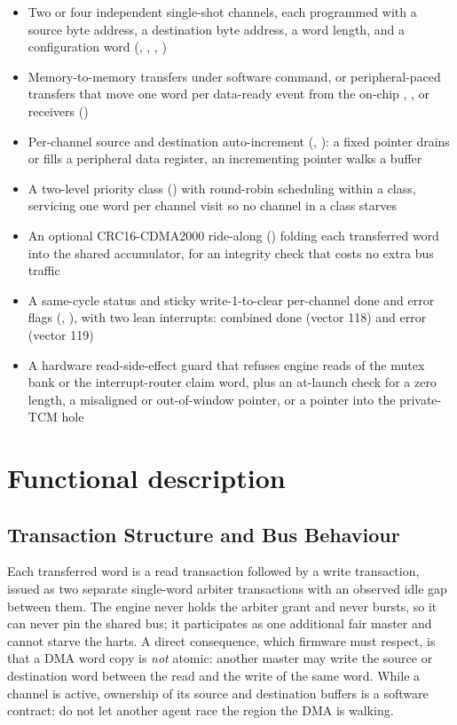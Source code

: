 \begin{itemize}
	\item Two or four independent single-shot channels, each programmed with a source byte address, a destination byte address, a word length, and a configuration word (, , , )
	\item Memory-to-memory transfers under software command, or peripheral-paced transfers that move one word per data-ready event from the on-chip , , or  receivers ()
	\item Per-channel source and destination auto-increment (, ): a fixed pointer drains or fills a peripheral data register, an incrementing pointer walks a buffer
	\item A two-level priority class () with round-robin scheduling within a class, servicing one word per channel visit so no channel in a class starves
	\item An optional \mbox{CRC16-CDMA2000} ride-along () folding each transferred word into the shared  accumulator, for an integrity check that costs no extra bus traffic
	\item A same-cycle  status and sticky write-1-to-clear per-channel done and error flags (, ), with two lean interrupts: combined done (vector 118) and error (vector 119)
	\item A hardware read-side-effect guard that refuses engine reads of the mutex bank or the interrupt-router claim word, plus an at-launch check for a zero length, a misaligned or out-of-window pointer, or a pointer into the private-TCM hole
\end{itemize}

\section{Functional description}

\subsection{Transaction Structure and Bus Behaviour}

Each transferred word is a read transaction followed by a write transaction, issued as two separate single-word arbiter transactions with an observed idle gap between them. The engine never holds the arbiter grant and never bursts, so it can never pin the shared bus; it participates as one additional fair master and cannot starve the harts. A direct consequence, which firmware must respect, is that a DMA word copy is \emph{not} atomic: another master may write the source or destination word between the read and the write of the same word. While a channel is active, ownership of its source and destination buffers is a software contract: do not let another agent race the region the DMA is walking.

